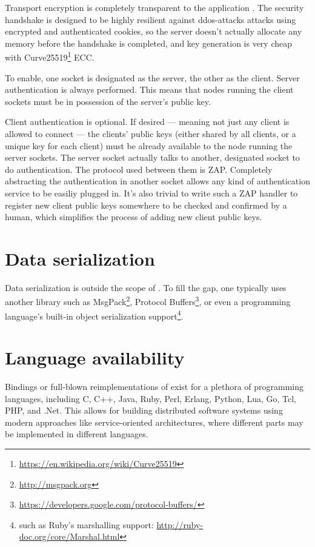 Transport encryption is completely transparent to the application . The
security handshake is designed to be highly resilient against
\glspl{ddos-attack} attacks using encrypted and authenticated cookies, so the
server doesn't actually allocate any memory before the handshake is completed,
and key generation is very cheap \cite[p.~2]{djb:ed25519} with
Curve25519\footnote{\url{https://en.wikipedia.org/wiki/Curve25519}} \gls{ECC}.

To enable, one socket is designated as the server, the other as the client.
Server authentication is always performed. This means that nodes running the
client sockets must be in possession of the server's public key.

Client authentication is optional. If desired --- meaning not just any client
is allowed to connect --- the clients' public keys (either shared by all
clients, or a unique key for each client) must be already available to the node
running the server sockets. The server socket actually talks to another,
designated socket to do authentication. The protocol used between them is
\gls{ZAP}. Completely abstracting the authentication in another socket allows
any kind of authentication service to be easiliy plugged in. It's also trivial
to write such a ZAP handler to register new client public keys somewhere to be
checked and confirmed by a human, which simplifies the process of adding new
client public keys.

\section{Data serialization}
Data serialization is outside the scope of \zmq. To fill the gap, one typically
uses another library such as MsgPack\footnote{\url{http://msgpack.org}},
Protocol
Buffers\footnote{\url{https://developers.google.com/protocol-buffers/}}, or
even a programming language's built-in object serialization
support\footnote{such as Ruby's marshalling support:
\url{http://ruby-doc.org/core/Marshal.html}}.

\section{Language availability}
Bindings or full-blown reimplementations of \zmq exist for a plethora of
programming languages, including C, C++, Java, Ruby, Perl, Erlang, Python, Lua,
Go, Tcl, PHP, and .Net. This allows for building distributed software systems
using modern approaches like service-oriented architectures, where different
parts may be implemented in different languages.


